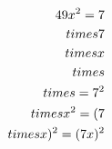 \documentclass[preview]{standalone}
\begin{document}
\begin{align*}
\special{dvisvgm:raw <g id='unique000'>}49x^2=7 \\times 7 \\times x \\times \\times = 7^2 \\times x^2 = (7 \\times x)^2 = (7x)^2\special{dvisvgm:raw </g>}
\end{align*}
\end{document}
